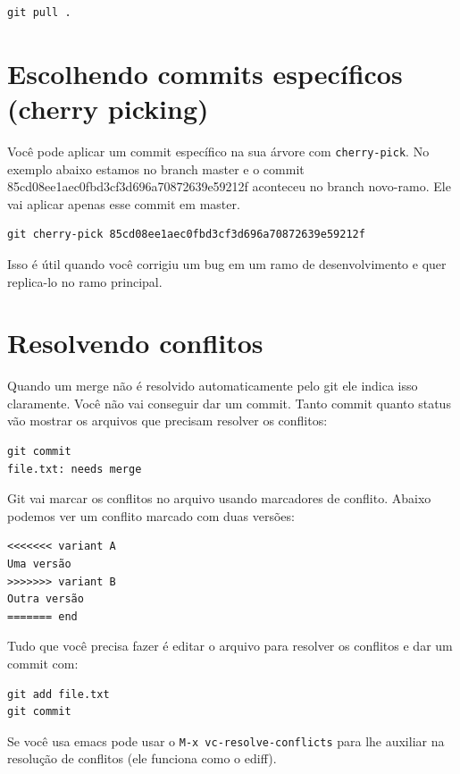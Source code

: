\documentclass[12pt,brazil]{book}
\begin{document}
\begin{verbatim}
git pull .
\end{verbatim}

\section{Escolhendo commits específicos (cherry picking)}
\label{sec:escolh-comm-espec}

Você pode aplicar um commit específico na sua árvore com
\texttt{cherry-pick}. No exemplo abaixo estamos no branch master e o
commit 85cd08ee1aec0fbd3cf3d696a70872639e59212f aconteceu no branch
novo-ramo. Ele vai aplicar apenas esse commit em master.

\begin{verbatim}
git cherry-pick 85cd08ee1aec0fbd3cf3d696a70872639e59212f
\end{verbatim}

Isso é útil quando você corrigiu um bug em um ramo de desenvolvimento
e quer replica-lo no ramo principal.

\section{Resolvendo conflitos}
\label{sec:resolvendo-conflitos}

Quando um merge não é resolvido automaticamente pelo git ele indica
isso claramente. Você não vai conseguir dar um commit. Tanto commit
quanto status vão mostrar os arquivos que precisam resolver os
conflitos:

\begin{verbatim}
git commit
file.txt: needs merge
\end{verbatim}

Git vai marcar os conflitos no arquivo usando marcadores de conflito.
Abaixo podemos ver um conflito marcado com duas versões:

\begin{verbatim}
<<<<<<< variant A
Uma versão
>>>>>>> variant B
Outra versão
======= end
\end{verbatim}

Tudo que você precisa fazer é editar o arquivo para resolver os
conflitos e dar um commit com:

\begin{verbatim}
git add file.txt
git commit
\end{verbatim}

Se você usa emacs pode usar o \texttt{M-x vc-resolve-conflicts} para
lhe auxiliar na resolução de conflitos (ele funciona como o ediff).
\end{document}
